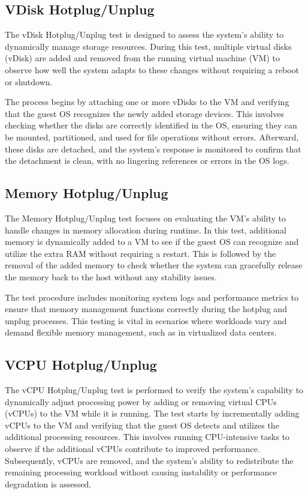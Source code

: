 \subsection{VDisk Hotplug/Unplug}
The vDisk Hotplug/Unplug test is designed to assess the system's ability to dynamically manage storage resources. During this test, multiple virtual disks (vDisk) are added and removed from the running virtual machine (VM) to observe how well the system adapts to these changes without requiring a reboot or shutdown.\mynewline

The process begins by attaching one or more vDisks to the VM and verifying that the guest OS recognizes the newly added storage devices. This involves checking whether the disks are correctly identified in the OS, ensuring they can be mounted, partitioned, and used for file operations without errors. Afterward, these disks are detached, and the system's response is monitored to confirm that the detachment is clean, with no lingering references or errors in the OS logs.

\subsection{Memory Hotplug/Unplug}
The Memory Hotplug/Unplug test focuses on evaluating the VM's ability to handle changes in memory allocation during runtime. In this test, additional memory is dynamically added to a VM to see if the guest OS can recognize and utilize the extra RAM without requiring a restart. This is followed by the removal of the added memory to check whether the system can gracefully release the memory back to the host without any stability issues.\mynewline

The test procedure includes monitoring system logs and performance metrics to ensure that memory management functions correctly during the hotplug and unplug processes. This testing is vital in scenarios where workloads vary and demand flexible memory management, such as in virtualized data centers.

\subsection{VCPU Hotplug/Unplug}
The vCPU Hotplug/Unplug test is performed to verify the system's capability to dynamically adjust processing power by adding or removing virtual CPUs (vCPUs) to the VM while it is running. The test starts by incrementally adding vCPUs to the VM and verifying that the guest OS detects and utilizes the additional processing resources. This involves running CPU-intensive tasks to observe if the additional vCPUs contribute to improved performance. Subsequently, vCPUs are removed, and the system's ability to redistribute the remaining processing workload without causing instability or performance degradation is assessed.\mynewline


